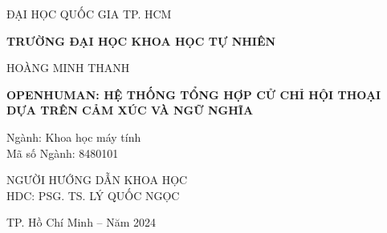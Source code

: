 \pagebreak





\begin{titlepage}

\begin{mdframed}[linewidth=1pt, 
	linecolor=black, 
	innerleftmargin=10mm, 
	innerrightmargin=10mm, 
	innertopmargin=10mm, 
	innerbottommargin=10mm]

	\centering
	\vspace*{1cm}
	
	{ ĐẠI HỌC QUỐC GIA TP. HCM\par}
	\vspace{0.25cm}
	\textbf{TRƯỜNG ĐẠI HỌC KHOA HỌC TỰ NHIÊN}\\
	
	\vspace{2cm}
	
	\large HOÀNG MINH THANH \\
	
	\vspace{2cm}
	
	\Large \textbf{\MakeUppercase{OpenHuman: Hệ thống tổng hợp cử chỉ hội thoại dựa trên cảm xúc và ngữ nghĩa }}\\
	
	\vspace{1cm}
	
	\flushleft
	{\normalsize Ngành: Khoa học máy tính}\\
	{ \normalsize Mã số Ngành: 8480101}\\
	
	\vspace{2cm}
	
	\centering
	{\normalsize NGƯỜI HƯỚNG DẪN KHOA HỌC } \\ 
	{\normalsize HDC: PSG. TS. LÝ QUỐC NGỌC} \\
	
	\vfill
	\vspace{3cm}
	
	
	{\small TP. Hồ Chí Minh – Năm 2024}
\end{mdframed}
\end{titlepage}



\pagebreak
{}


\pagebreak

